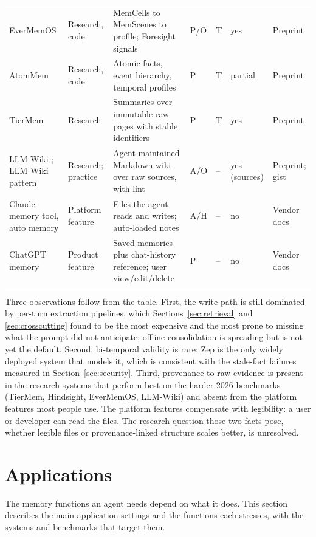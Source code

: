 \documentclass[11pt]{article}
\begin{document}
\begin{table}[tp]
\begin{tabularx}{\textwidth}{L{2.2cm} L{1.5cm} X L{0.9cm} L{0.85cm} L{1.3cm} L{2.2cm}}
EverMemOS \citep{hu2026evermemos} & Research, code & MemCells to MemScenes to profile; Foresight signals & P/O & T & yes & Preprint \\
AtomMem \citep{yao2026atommem} & Research, code & Atomic facts, event hierarchy, temporal profiles & P & T & partial & Preprint \\
TierMem \citep{zhu2026tiermem} & Research & Summaries over immutable raw pages with stable identifiers & P & T & yes & Preprint \\
LLM-Wiki \citep{ming2026llmwiki}; LLM Wiki pattern \citep{karpathy2026wiki} & Research; practice & Agent-maintained Markdown wiki over raw sources, with lint & A/O & -- & yes (sources) & Preprint; gist \\
Claude memory tool, auto memory \citep{anthropic2025memorytool,anthropic2026claudecode} & Platform feature & Files the agent reads and writes; auto-loaded notes & A/H & -- & no & Vendor docs \\
ChatGPT memory \citep{openai2026memory} & Product feature & Saved memories plus chat-history reference; user view/edit/delete & P & -- & no & Vendor docs \\
\bottomrule
\end{tabularx}
\end{table}

Three observations follow from the table. First, the write path is still dominated by per-turn extraction pipelines, which Sections~\ref{sec:retrieval} and \ref{sec:crosscutting} found to be the most expensive and the most prone to missing what the prompt did not anticipate; offline consolidation is spreading but is not yet the default. Second, bi-temporal validity is rare: Zep is the only widely deployed system that models it, which is consistent with the stale-fact failures measured in Section~\ref{sec:security}. Third, provenance to raw evidence is present in the research systems that perform best on the harder 2026 benchmarks (TierMem, Hindsight, EverMemOS, LLM-Wiki) and absent from the platform features most people use. The platform features compensate with legibility: a user or developer can read the files. The research question those two facts pose, whether legible files or provenance-linked structure scales better, is unresolved.

\section{Applications}
\label{sec:applications}

The memory functions an agent needs depend on what it does. This section describes the main application settings and the functions each stresses, with the systems and benchmarks that target them.
\end{document}
